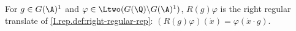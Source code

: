 For $g\in G(\A)^1$ and $\varphi\in\Ltwo(G(\Q)\backslash G(\A)^1)$, $R(g)\varphi$ is the right regular translate of \cref{I.rep.def:right-regular-rep}: $(R(g)\varphi)(\dot x)=\varphi(\dot x\cdot g)$.

